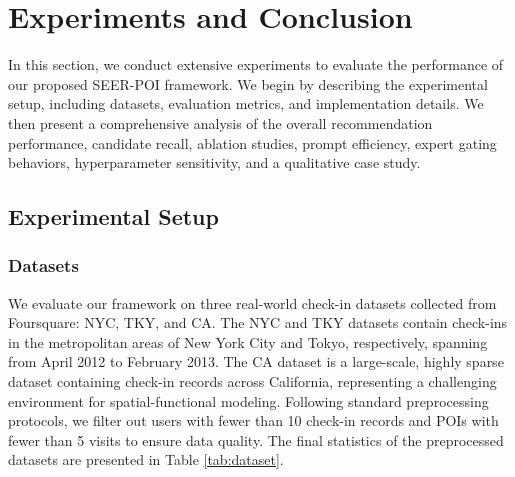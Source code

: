 \documentclass[10pt,twocolumn]{article}
\newcommand{\method}{SEER-POI}
\begin{document}
\section{Experiments and Conclusion}
In this section, we conduct extensive experiments to evaluate the performance of our proposed \method{} framework. We begin by describing the experimental setup, including datasets, evaluation metrics, and implementation details. We then present a comprehensive analysis of the overall recommendation performance, candidate recall, ablation studies, prompt efficiency, expert gating behaviors, hyperparameter sensitivity, and a qualitative case study.

\subsection{Experimental Setup}
\subsubsection{Datasets}
We evaluate our framework on three real-world check-in datasets collected from Foursquare: NYC, TKY, and CA. The NYC and TKY datasets contain check-ins in the metropolitan areas of New York City and Tokyo, respectively, spanning from April 2012 to February 2013. The CA dataset is a large-scale, highly sparse dataset containing check-in records across California, representing a challenging environment for spatial-functional modeling. Following standard preprocessing protocols, we filter out users with fewer than 10 check-in records and POIs with fewer than 5 visits to ensure data quality. The final statistics of the preprocessed datasets are presented in Table \ref{tab:dataset}.

\begin{table}[h]
\centering
\caption{Dataset Statistics.}
\label{tab:dataset}
\small
\noindent{}
\end{table}
\end{document}
